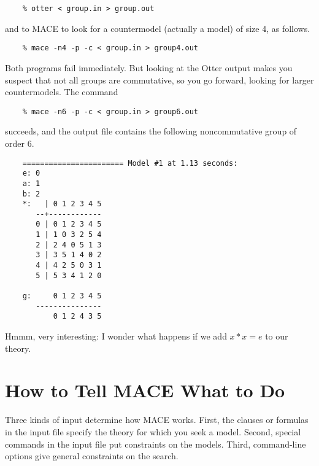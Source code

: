 \documentclass[11pt]{article}
\begin{document}
\begin{small}
\begin{verbatim}
    % otter < group.in > group.out
\end{verbatim}
\end{small}
\noindent and to MACE to look for a countermodel (actually a model) of size 4,
as follows.

\begin{small}
\begin{verbatim}
    % mace -n4 -p -c < group.in > group4.out
\end{verbatim}
\end{small}
\noindent Both programs fail immediately.  But looking at the Otter
output makes you suspect that not all groups are commutative,
so you go forward, looking for larger countermodels.
The command

\begin{small}
\begin{verbatim}
    % mace -n6 -p -c < group.in > group6.out
\end{verbatim}
\end{small}
\noindent succeeds, and the output file contains the following
noncommutative group of order 6.

\begin{small}
\begin{verbatim}
    ======================= Model #1 at 1.13 seconds:
    e: 0
    a: 1
    b: 2
    *:   | 0 1 2 3 4 5
       --+------------
       0 | 0 1 2 3 4 5
       1 | 1 0 3 2 5 4
       2 | 2 4 0 5 1 3
       3 | 3 5 1 4 0 2
       4 | 4 2 5 0 3 1
       5 | 5 3 4 1 2 0
       
    g:     0 1 2 3 4 5
       ---------------
           0 1 2 4 3 5
\end{verbatim}
\end{small}
\noindent Hmmm, very interesting:  I wonder what happens if we add $x*x=e$
to our theory.

\section{How to Tell MACE What to Do}

Three kinds of input determine how MACE works.
First, the clauses or formulas in the input file specify
the theory for which you seek a model.
Second, special commands in the input file put
constraints on the models.
Third, command-line options give general constraints
on the search.
\end{document}
